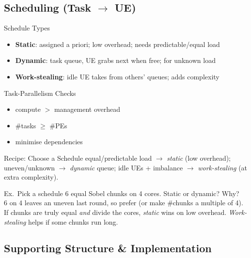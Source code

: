 \subsection{Scheduling (Task $\to$ UE)}


\begin{definition}{Schedule Types}
    \begin{itemize}
        \item \textbf{Static}: assigned a priori; low overhead; needs predictable/equal load
        \item \textbf{Dynamic}: task queue, UE grabs next when free; for unknown load
        \item \textbf{Work-stealing}: idle UE takes from others' queues; adds complexity
    \end{itemize}
\end{definition}

\begin{concept}{Task-Parallelism Checks}
    \begin{itemize}
        \item compute $>$ management overhead
        \item \#tasks $\geq$ \#PEs
        \item minimise dependencies
    \end{itemize}
\end{concept}

\multend

\begin{KR}{Recipe: Choose a Schedule}
    equal/predictable load $\to$ \emph{static} (low overhead); uneven/unknown $\to$ \emph{dynamic} queue; idle UEs + imbalance $\to$ \emph{work-stealing} (at extra complexity).
\end{KR}

\begin{example2}{Ex.\ Pick a schedule}
    6 equal Sobel chunks on 4 cores. Static or dynamic? Why?
     \\ 
    6 on 4 leaves an uneven last round, so prefer  (or make \#chunks a multiple of 4). If chunks are truly equal \emph{and} divide the cores, \emph{static} wins on low overhead. \emph{Work-stealing} helps if some chunks run long.
\end{example2}

\subsection{Supporting Structure \& Implementation}

